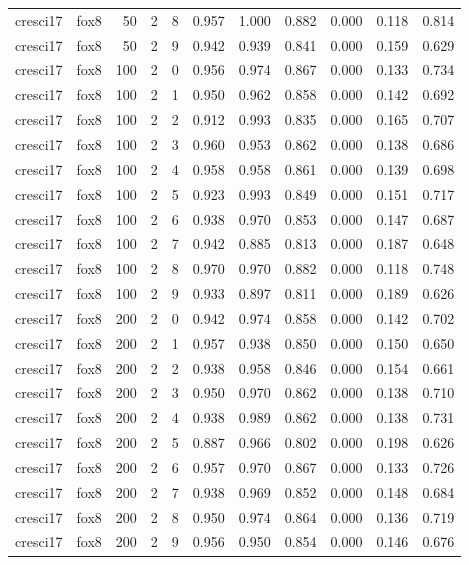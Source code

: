 \begin{tabular}{llrrrrrrrrr}
cresci17 & fox8 & 50 & 2 & 8 & 0.957 & 1.000 & 0.882 & 0.000 & 0.118 & 0.814 \\
cresci17 & fox8 & 50 & 2 & 9 & 0.942 & 0.939 & 0.841 & 0.000 & 0.159 & 0.629 \\
cresci17 & fox8 & 100 & 2 & 0 & 0.956 & 0.974 & 0.867 & 0.000 & 0.133 & 0.734 \\
cresci17 & fox8 & 100 & 2 & 1 & 0.950 & 0.962 & 0.858 & 0.000 & 0.142 & 0.692 \\
cresci17 & fox8 & 100 & 2 & 2 & 0.912 & 0.993 & 0.835 & 0.000 & 0.165 & 0.707 \\
cresci17 & fox8 & 100 & 2 & 3 & 0.960 & 0.953 & 0.862 & 0.000 & 0.138 & 0.686 \\
cresci17 & fox8 & 100 & 2 & 4 & 0.958 & 0.958 & 0.861 & 0.000 & 0.139 & 0.698 \\
cresci17 & fox8 & 100 & 2 & 5 & 0.923 & 0.993 & 0.849 & 0.000 & 0.151 & 0.717 \\
cresci17 & fox8 & 100 & 2 & 6 & 0.938 & 0.970 & 0.853 & 0.000 & 0.147 & 0.687 \\
cresci17 & fox8 & 100 & 2 & 7 & 0.942 & 0.885 & 0.813 & 0.000 & 0.187 & 0.648 \\
cresci17 & fox8 & 100 & 2 & 8 & 0.970 & 0.970 & 0.882 & 0.000 & 0.118 & 0.748 \\
cresci17 & fox8 & 100 & 2 & 9 & 0.933 & 0.897 & 0.811 & 0.000 & 0.189 & 0.626 \\
cresci17 & fox8 & 200 & 2 & 0 & 0.942 & 0.974 & 0.858 & 0.000 & 0.142 & 0.702 \\
cresci17 & fox8 & 200 & 2 & 1 & 0.957 & 0.938 & 0.850 & 0.000 & 0.150 & 0.650 \\
cresci17 & fox8 & 200 & 2 & 2 & 0.938 & 0.958 & 0.846 & 0.000 & 0.154 & 0.661 \\
cresci17 & fox8 & 200 & 2 & 3 & 0.950 & 0.970 & 0.862 & 0.000 & 0.138 & 0.710 \\
cresci17 & fox8 & 200 & 2 & 4 & 0.938 & 0.989 & 0.862 & 0.000 & 0.138 & 0.731 \\
cresci17 & fox8 & 200 & 2 & 5 & 0.887 & 0.966 & 0.802 & 0.000 & 0.198 & 0.626 \\
cresci17 & fox8 & 200 & 2 & 6 & 0.957 & 0.970 & 0.867 & 0.000 & 0.133 & 0.726 \\
cresci17 & fox8 & 200 & 2 & 7 & 0.938 & 0.969 & 0.852 & 0.000 & 0.148 & 0.684 \\
cresci17 & fox8 & 200 & 2 & 8 & 0.950 & 0.974 & 0.864 & 0.000 & 0.136 & 0.719 \\
cresci17 & fox8 & 200 & 2 & 9 & 0.956 & 0.950 & 0.854 & 0.000 & 0.146 & 0.676 \\

\end{tabular}
